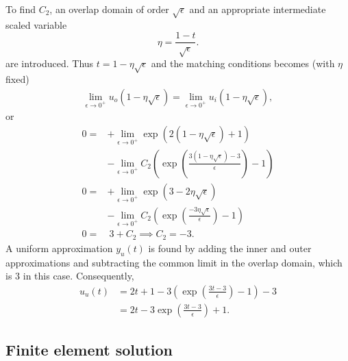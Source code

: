   To find $C_2$, an overlap domain of order $\sqrt{\epsilon}$ and an appropriate intermediate scaled variable
  $$\eta = \frac{1 - t}{\sqrt{\epsilon}}.$$
  are introduced.  Thus $t = 1 - \eta\sqrt{\epsilon}$ and the matching conditions becomes (with $\eta$ fixed)
  \begin{align*}
    \lim_{\epsilon \rightarrow 0^+} u_o\left(1 - \eta\sqrt{\epsilon}\right) = \lim_{\epsilon \rightarrow 0^+} u_i\left(1 - \eta\sqrt{\epsilon}\right),
  \end{align*}
  or
  \begin{align*}
    0 = &+ \lim_{\epsilon \rightarrow 0^+} \exp\left( 2(1 - \eta\sqrt{\epsilon}) + 1 \right) \\
        &- \lim_{\epsilon \rightarrow 0^+} C_2\left(\exp\left(\frac{3(1 - \eta\sqrt{\epsilon}) - 3}{\epsilon} \right) - 1 \right) \\
    0 = &+ \lim_{\epsilon \rightarrow 0^+} \exp\left( 3 - 2\eta\sqrt{\epsilon} \right) \\
        &- \lim_{\epsilon \rightarrow 0^+} C_2\left(\exp\left(\frac{- 3\eta\sqrt{\epsilon}}{\epsilon} \right) - 1 \right) \\
    0 = &\ 3 + C_2 \implies C_2 = -3.
  \end{align*}
  A uniform approximation $y_u(t)$ is found by adding the inner and outer approximations and subtracting the common limit in the overlap domain, which is $3$ in this case.  Consequently,
  \begin{align*}
    u_u(t) &= 2t + 1 - 3 \left( \exp\left( \frac{3t - 3}{\epsilon} \right) - 1 \right) - 3 \\
    &= 2t - 3 \exp\left( \frac{3t - 3}{\epsilon} \right) + 1.
  \end{align*}

  \subsection{Finite element solution} \label{ssn_intro_sing_perp_one}
  
